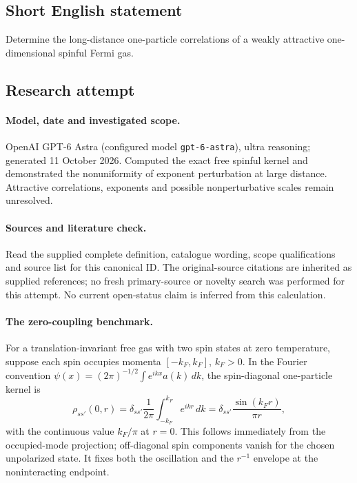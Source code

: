 \documentclass[11pt]{article}
\begin{document}
\subsection{Short English statement}
Determine the long-distance one-particle correlations of a weakly attractive one-dimensional spinful Fermi gas.
\subsection{Research attempt}
\paragraph{Model, date and investigated scope.}
OpenAI GPT-6 Astra (configured model \texttt{gpt-6-astra}), ultra reasoning; generated 11 October 2026. Computed the exact free spinful kernel and demonstrated the nonuniformity of exponent perturbation at large distance. Attractive correlations, exponents and possible nonperturbative scales remain unresolved.

\paragraph{Sources and literature check.}
Read the supplied complete definition, catalogue wording, scope qualifications and source list for this canonical ID. The original-source citations are inherited as supplied references; no fresh primary-source or novelty search was performed for this attempt. No current open-status claim is inferred from this calculation.

\paragraph{The zero-coupling benchmark.}For a translation-invariant free gas with two spin states at zero temperature, suppose each spin occupies momenta \([-k_F,k_F]\), \(k_F>0\). In the Fourier convention \(\psi(x)=(2\pi)^{-1/2}\int e^{ikx}a(k)\,dk\), the spin-diagonal one-particle kernel is
\[\rho_{ss'}(0,r)=\delta_{ss'}\frac1{2\pi}\int_{-k_F}^{k_F}e^{ikr}\,dk
=\delta_{ss'}\frac{\sin(k_Fr)}{\pi r},\]
with the continuous value \(k_F/\pi\) at \(r=0\). This follows immediately from the occupied-mode projection; off-diagonal spin components vanish for the chosen unpolarized state. It fixes both the oscillation and the \(r^{-1}\) envelope at the noninteracting endpoint.
\end{document}
